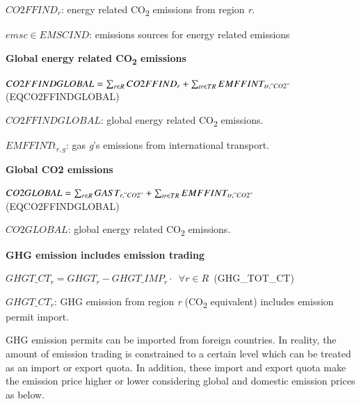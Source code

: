\documentclass[10pt,a4paper,titlepage,dvipdfmx]{book}
\begin{document}
\begin{flushleft}
$CO2FFIND_{r}$: energy related CO\textsubscript{2} emissions from region \textit{r}.

$emsc\in EMSCIND$: emissions sources for energy related emissions
\end{flushleft}

\begin{flushleft}\textbf{Global energy related CO\textsubscript{2} emissions }\end{flushleft}


\begin{center}$CO2FFINDGLOBAL=\sum _{r\in R}CO2FFIND_{r}+\sum _{tr\in TR}EMFFINT_{tr,"CO2"}\,$ (EQCO2FFINDGLOBAL)
\end{center}

\begin{flushleft}
$CO2FFINDGLOBAL$: global energy related CO\textsubscript{2} emissions.

$EMFFINTt_{r,g}$: gas \textit{g}'s emissions from international transport.
\end{flushleft}


\begin{flushleft}\textbf{Global CO2 emissions }\end{flushleft}


\begin{center}$CO2GLOBAL=\sum _{r\in R}GAST_{r,"CO2"}+\sum _{tr\in TR}EMFFINT_{tr,"CO2"}\,$ (EQCO2FFINDGLOBAL)
\end{center}

\begin{flushleft} $CO2GLOBAL$: global energy related CO\textsubscript{2} emissions. \end{flushleft}

\begin{flushleft}\textbf{GHG emission includes emission trading}\end{flushleft}


\begin{center}$GHGT\_ CT_{r}\hspace{0pt}=GHGT_{r}-GHGT\_ IMP_{r}\cdot \,\,\,\forall r\in R\,$ (GHG\_TOT\_CT)
\end{center}

\begin{flushleft} $GHGT\_CT_{r}$: GHG emission from region \textit{r} (CO\textsubscript{2} equivalent) includes emission permit import. \end{flushleft}

GHG emission permits can be imported from foreign countries. In reality, the amount of emission trading is constrained to a certain level which can be treated as an import or export quota. In addition, these import and export quota make the emission price higher or lower considering global and domestic emission prices as below.
\end{document}
